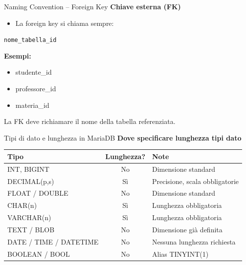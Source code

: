 \documentclass{beamer}
\begin{document}
\begin{frame}{Naming Convention -- Foreign Key}
\small
\textbf{Chiave esterna (FK)}

\begin{itemize}
    \item La foreign key si chiama sempre:
\end{itemize}

\medskip
\centerline{\texttt{nome\_tabella\_id}}

\medskip
\textbf{Esempi:}
\begin{itemize}
    \item studente\_id
    \item professore\_id
    \item materia\_id
\end{itemize}

\medskip
\alert{La FK deve richiamare il nome della tabella referenziata.}
\end{frame}

\begin{frame}{Tipi di dato e lunghezza in MariaDB}
\small
\textbf{Dove specificare lunghezza tipi dato}

\medskip
\begin{tabular}{|l|c|l|}
\hline
\textbf{Tipo} & \textbf{Lunghezza?} & \textbf{Note} \\
\hline
INT, BIGINT & No & Dimensione standard \\
DECIMAL(p,s) & Sì & Precisione, scala obbligatorie \\
FLOAT / DOUBLE & No & Dimensione standard \\
CHAR(n) & Sì & Lunghezza obbligatoria \\
VARCHAR(n) & Sì & Lunghezza obbligatoria \\
TEXT / BLOB & No & Dimensione già definita \\
DATE / TIME / DATETIME & No & Nessuna lunghezza richiesta \\
BOOLEAN / BOOL & No & Alias TINYINT(1) \\
\hline
\end{tabular}

\end{frame}

\end{document}
